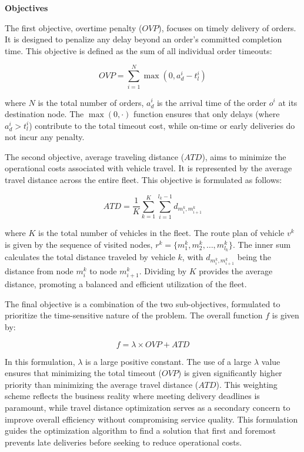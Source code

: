 \documentclass[]{interact}
\begin{document}
\textbf{Objectives}

The first objective, overtime penalty ($OVP$), focuses on timely delivery of orders. It is designed to penalize any delay beyond an order's committed completion time. This objective is defined as the sum of all individual order timeouts:

\begin{equation}
OVP = \sum_{i=1}^{N} \max(0, a_d^i - t_l^i)
\end{equation}

where $N$ is the total number of orders, $a_d^i$ is the arrival time of the order $o^i$ at its destination node. The $\max(0, \cdot)$ function ensures that only delays (where $a_d^i > t_l^i$) contribute to the total timeout cost, while on-time or early deliveries do not incur any penalty.

The second objective, average traveling distance ($ATD$), aims to minimize the operational costs associated with vehicle travel. It is represented by the average travel distance across the entire fleet. This objective is formulated as follows:

\begin{equation}
ATD = \frac{1}{K} \sum_{k=1}^{K} \sum_{i=1}^{l_k - 1} d_{m_i^k, m_{i+1}^k}
\end{equation}

where $K$ is the total number of vehicles in the fleet. The route plan of vehicle $v^k$ is given by the sequence of visited nodes, $r^k = \{m_1^k, m_2^k, \dots, m_{l_k}^k\}$. The inner sum calculates the total distance traveled by vehicle $k$, with $d_{m_i^k, m_{i+1}^k}$ being the distance from node $m_i^k$ to node $m_{i+1}^k$. Dividing by $K$ provides the average distance, promoting a balanced and efficient utilization of the fleet.

The final objective is a combination of the two sub-objectives, formulated to prioritize the time-sensitive nature of the problem. The overall function $f$ is given by:

\begin{equation}\label{eq:f}
f = \lambda \times OVP + ATD    
\end{equation}

In this formulation, $\lambda$ is a large positive constant. The use of a large $\lambda$ value ensures that minimizing the total timeout ($OVP$) is given significantly higher priority than minimizing the average travel distance ($ATD$). This weighting scheme reflects the business reality where meeting delivery deadlines is paramount, while travel distance optimization serves as a secondary concern to improve overall efficiency without compromising service quality. This formulation guides the optimization algorithm to find a solution that first and foremost prevents late deliveries before seeking to reduce operational costs.
\end{document}

